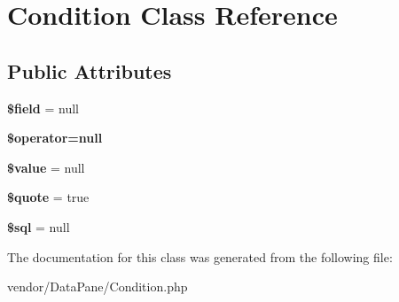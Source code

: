 \hypertarget{classCondition}{
\section{Condition Class Reference}
\label{classCondition}
}
\subsection*{Public Attributes}
\begin{DoxyCompactItemize}
\item 
\hypertarget{classCondition_a9ff08a5b43e5de9c16fa3827266e724f}{
{\bfseries \$field} = null}
\label{classCondition_a9ff08a5b43e5de9c16fa3827266e724f}

\item 
\hypertarget{classCondition_a40d11fac8c7e24e2ce08e1473eac7910}{
{\bfseries \$operator=null}}
\label{classCondition_a40d11fac8c7e24e2ce08e1473eac7910}

\item 
\hypertarget{classCondition_a89780700d217baf4c5549925d8b54d41}{
{\bfseries \$value} = null}
\label{classCondition_a89780700d217baf4c5549925d8b54d41}

\item 
\hypertarget{classCondition_a598a7d5c2849f7bb6081eb7bffbd88b4}{
{\bfseries \$quote} = true}
\label{classCondition_a598a7d5c2849f7bb6081eb7bffbd88b4}

\item 
\hypertarget{classCondition_a1fb1367fc77d51bf6694487d0706583c}{
{\bfseries \$sql} = null}
\label{classCondition_a1fb1367fc77d51bf6694487d0706583c}

\end{DoxyCompactItemize}


The documentation for this class was generated from the following file:\begin{DoxyCompactItemize}
\item 
vendor/DataPane/Condition.php\end{DoxyCompactItemize}

